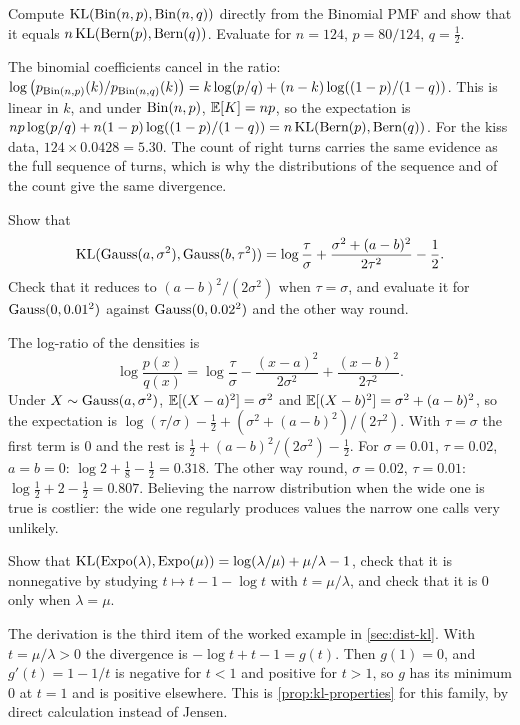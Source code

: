 \begin{exercise}
\label{ex:dist-kl-binomial}
Compute $\mathrm{KL}(\mathrm{Bin}(n, p), \mathrm{Bin}(n, q))$ directly from the Binomial PMF and show that it equals $n\,\mathrm{KL}(\text{Bern}(p), \text{Bern}(q))$. Evaluate for $n = 124$, $p = 80/124$, $q = \frac12$.
\end{exercise}
\begin{solution}
The binomial coefficients cancel in the ratio: $\log\big(p_{\mathrm{Bin}(n,p)}(k)/p_{\mathrm{Bin}(n,q)}(k)\big) = k\log(p/q) + (n - k)\log((1-p)/(1-q))$. This is linear in $k$, and under $\mathrm{Bin}(n, p)$, $\operatorname*{\mathbb{E}}[K] = np$, so the expectation is $np\log(p/q) + n(1 - p)\log((1-p)/(1-q)) = n\,\mathrm{KL}(\text{Bern}(p), \text{Bern}(q))$. For the kiss data, $124 \times 0.0428 = 5.30$. The count of right turns carries the same evidence as the full sequence of turns, which is why the distributions of the sequence and of the count give the same divergence.
\end{solution}

\begin{exercise}
\label{ex:dist-kl-gauss}
Show that
\[
\mathrm{KL}(\text{Gauss}(a, \sigma^2), \text{Gauss}(b, \tau^2)) = \log\frac{\tau}{\sigma} + \frac{\sigma^2 + (a - b)^2}{2\tau^2} - \frac12.
\]
Check that it reduces to $(a - b)^2/(2\sigma^2)$ when $\tau = \sigma$, and evaluate it for $\text{Gauss}(0, 0.01^2)$ against $\text{Gauss}(0, 0.02^2)$ and the other way round.
\end{exercise}
\begin{solution}
The log-ratio of the densities is
\[
\log\frac{p(x)}{q(x)} = \log\frac{\tau}{\sigma} - \frac{(x - a)^2}{2\sigma^2} + \frac{(x - b)^2}{2\tau^2}.
\]
Under $X \sim \text{Gauss}(a, \sigma^2)$, $\operatorname*{\mathbb{E}}[(X - a)^2] = \sigma^2$ and $\operatorname*{\mathbb{E}}[(X - b)^2] = \sigma^2 + (a - b)^2$, so the expectation is $\log(\tau/\sigma) - \frac12 + (\sigma^2 + (a-b)^2)/(2\tau^2)$. With $\tau = \sigma$ the first term is $0$ and the rest is $\frac12 + (a - b)^2/(2\sigma^2) - \frac12$. For $\sigma = 0.01$, $\tau = 0.02$, $a = b = 0$: $\log 2 + \frac{1}{8} - \frac12 = 0.318$. The other way round, $\sigma = 0.02$, $\tau = 0.01$: $\log\frac12 + 2 - \frac12 = 0.807$. Believing the narrow distribution when the wide one is true is costlier: the wide one regularly produces values the narrow one calls very unlikely.
\end{solution}

\begin{exercise}
\label{ex:dist-kl-expo}
Show that $\mathrm{KL}(\text{Expo}(\lambda), \text{Expo}(\mu)) = \log(\lambda/\mu) + \mu/\lambda - 1$, check that it is nonnegative by studying $t \mapsto t - 1 - \log t$ with $t = \mu/\lambda$, and check that it is $0$ only when $\lambda = \mu$.
\end{exercise}
\begin{solution}
The derivation is the third item of the worked example in \cref{sec:dist-kl}. With $t = \mu/\lambda > 0$ the divergence is $-\log t + t - 1 = g(t)$. Then $g(1) = 0$, and $g'(t) = 1 - 1/t$ is negative for $t < 1$ and positive for $t > 1$, so $g$ has its minimum $0$ at $t = 1$ and is positive elsewhere. This is \cref{prop:kl-properties} for this family, by direct calculation instead of Jensen.
\end{solution}

